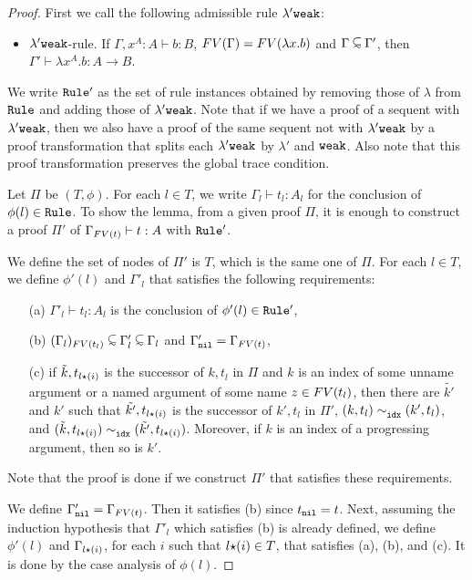 \begin{proof}
  First we call the following admissible rule $\lambda'{\tt weak}$:
  \begin{itemize}
  \item
    $\lambda'{\tt weak}$-rule.
    If $\Gamma, x^A:A \vdash b: B$, ${{\relax FV}}(\Gamma) = {{\relax FV}}(\lambda x.b)$ and $\Gamma\subseteqsim \Gamma'$, 
    then $ \Gamma' \vdash \lambda x^A.b :A \rightarrow B$.
  \end{itemize}
  We write ${\tt Rule}'$ as the set of rule instances obtained by removing
  those of $\lambda$ from ${\tt Rule}$ and adding those of $\lambda'{\tt weak}$. 
  Note that if we have a proof of a sequent with $\lambda'{\tt weak}$,
  then we also have a proof of the same sequent not with $\lambda'{\tt weak}$
  by a proof transformation that splits each $\lambda'{\tt weak}$ by $\lambda'$ and ${\tt weak}$. 
  Also note that this proof transformation preserves the global trace condition.

  Let $\Pi$ be $(T,\phi)$.
  For each $l \in T$, we write $\Gamma_l\vdash t_l:A_l$
  for the conclusion of $\phi(l) \in {\tt Rule}$. 
  To show the lemma, from a given proof $\Pi$, 
  it is enough to construct a proof $\Pi'$ of $\Gamma_{{{\relax FV}}(t)}\vdash t:A$ with ${\tt Rule}'$.
  
  We define the set of nodes of $\Pi'$ is $T$, which is the same one of $\Pi$. 
  For each $l\in T$, we define $\phi'(l)$ and $\Gamma'_l$ that satisfies
  the following requirements:
  \begin{itemize}
  \item[(a)]
    $\Gamma'_l\vdash t_l:A_l$ is the conclusion of $\phi'(l) \in {\tt Rule}'$,
  \item[(b)]
    $\Restrict{(\Gamma_l)}{\FV(t_l)} \subseteqsim \Gamma'_l \subseteqsim \Gamma_l$
    and $\Gamma'_{{\tt nil}} = \Gamma_{{{\relax FV}}(t)}$, 
  \item[(c)]
    if $\tilde{k},t_{l{\star}(i)}$ is the successor of $k,t_l$ in $\Pi$
    and $k$ is an index of some unname argument
    or a named argument of some name $z\in{{\relax FV}}(t_l)$, 
    then there are $\tilde{k'}$ and $k'$ such that
    $\tilde{k'},t_{l{\star}(i)}$ is the successor of $k',t_l$ in $\Pi'$, 
    $(k,t_l) \sim^{}_{{\tt idx}} (k',t_l)$,
    and $(\tilde{k},t_{l{\star}(i)}) \sim^{}_{{\tt idx}} (\tilde{k'},t_{l{\star}(i)})$.
    Moreover, if $k$ is an index of a progressing argument, then so is $k'$.
  \end{itemize}
  Note that the proof is done if we construct $\Pi'$ that satisfies these requirements. 
  
  We define $\Gamma'_{{\tt nil}} = \Gamma_{{{\relax FV}}(t)}$.
  Then it satisfies (b) since $t_{\tt nil} = t$. 
  Next, assuming the induction hypothesis that $\Gamma'_l$ which satisfies (b)
  is already defined, 
  we define $\phi'(l)$ and $\Gamma_{l{\star}(i)}$, 
  for each $i$ such that $l{\star}(i)\in T$, 
  that satisfies (a), (b), and (c). 
  It is done by the case analysis of $\phi(l)$.


\end{proof}
